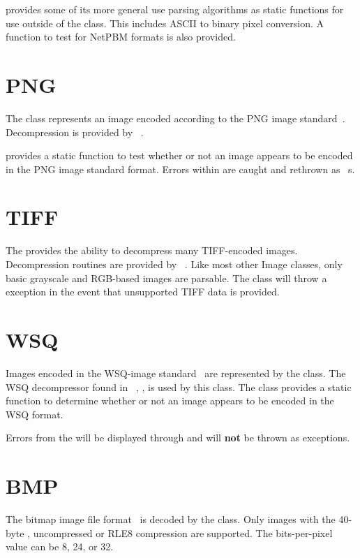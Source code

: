 provides some of its more general use parsing algorithms as
static functions for use outside of the class.  This includes ASCII to binary
pixel conversion.  A function to test for NetPBM formats is also provided.

\section{PNG}
\label{sec-image-png}
The  class represents an image encoded according to the PNG image 
standard~\cite{png}.  Decompression is provided by 
~\cite{libpng}.

 provides a static function to test whether or not an image appears
to be encoded in the PNG image standard format.  Errors within 
are caught and rethrown as ~s.

\section{TIFF}
\label{sec-image-tiff}
The  provides the ability to decompress many TIFF-encoded images.
Decompression routines are provided by ~\cite{libtiff}. Like most
other Image classes, only basic grayscale and RGB-based images are parsable. The
 class will throw a  exception in the event
that unsupported TIFF data is provided.

\section{WSQ}
\label{sec-image-wsq}
Images encoded in the WSQ-image standard~\cite{std:wsq} are represented by the 
 class.  The WSQ decompressor found in \nbis~\cite{nist:nbis}, 
, is used by this class.  The class provides a static function to determine whether or not an image appears to be encoded in the WSQ format.

Errors from the  will be displayed through 
and will {\bf not} be thrown as exceptions.

\section{BMP}
\label{sec-image-bmp}
The bitmap image file format~\cite{bmp} is decoded by the  class.
Only images
with the 40-byte , uncompressed or RLE8 compression
are supported. The bits-per-pixel value can be 8, 24, or 32.
